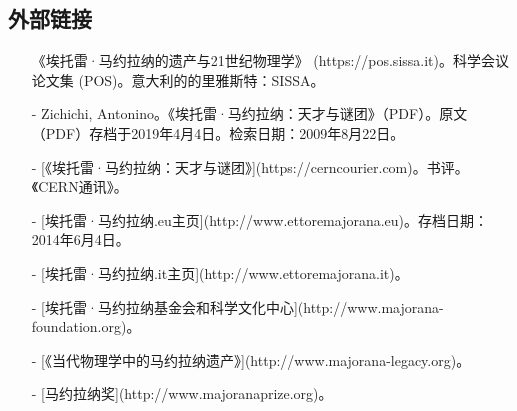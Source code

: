 \subsection{外部链接}
\begin{itemize}
\item [《埃托雷·马约拉纳的遗产与21世纪物理学》](https://pos.sissa.it)。科学会议论文集 (POS)。意大利的的里雅斯特：SISSA。

- Zichichi, Antonino。《埃托雷·马约拉纳：天才与谜团》（PDF）。原文（PDF）存档于2019年4月4日。检索日期：2009年8月22日。

- [《埃托雷·马约拉纳：天才与谜团》](https://cerncourier.com)。书评。《CERN通讯》。

- [埃托雷·马约拉纳.eu主页](http://www.ettoremajorana.eu)。存档日期：2014年6月4日。

- [埃托雷·马约拉纳.it主页](http://www.ettoremajorana.it)。

- [埃托雷·马约拉纳基金会和科学文化中心](http://www.majorana-foundation.org)。

- [《当代物理学中的马约拉纳遗产》](http://www.majorana-legacy.org)。

- [马约拉纳奖](http://www.majoranaprize.org)。
\end{itemize}